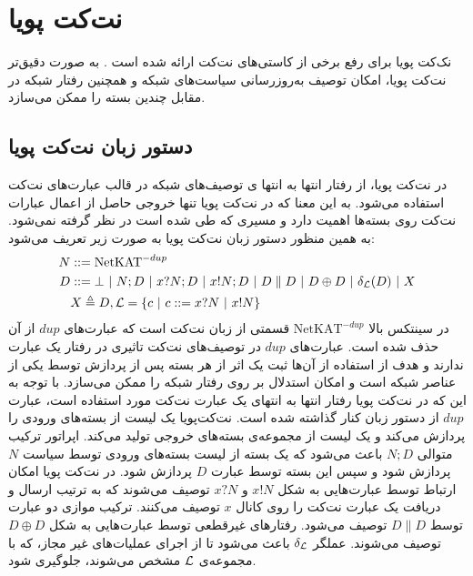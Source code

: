 \section{نت‌کت پویا}
نک‌کت‌ پویا%
برای رفع برخی از کاستی‌های نت‌کت ارائه شده است
\cite{dynetkat}.
به صورت دقیق‌تر نت‌کت پویا، امکان توصیف به‌روز‌رسانی سیاست‌های شبکه و همچنین رفتار شبکه در مقابل چندین بسته را ممکن می‌سازد.

\subsection{دستور زبان نت‌کت پویا}
در نت‌کت‌ پویا، از رفتار انتها به انتها‌%
ی توصیف‌های شبکه در قالب عبارت‌های نت‌کت استفاده می‌شود.
به این معنا که در نت‌کت پویا تنها خروجی حاصل از اعمال عبارات نت‌کت روی بسته‌ها اهمیت دارد و مسیری که طی شده است در نظر گرفته نمی‌شود.
به همین منظور دستور زبان نت‌کت‌ پویا به صورت زیر تعریف می‌شود:
\begin{align*}
    N & :: = \mathrm{NetKAT}^{-dup}                    \\
    D & :: = \bot ~|~ N;D ~|~ x?N;D ~|~ x!N;D ~|~ D\parallel D
    ~|~ D \oplus D ~|~ \delta_{\mathcal{L}}(D) ~|~ X                                     \\
      & X \triangleq D, \mathcal{L} = \{c ~|~ c ::= x?N ~|~ x!N\}
\end{align*}
در سینتکس بالا
$\mathrm{NetKAT}^{-dup}$
قسمتی از زبان نت‌کت است که عبارت‌های
$dup$
از آن حذف شده است.
عبارت‌های
$dup$
در توصیف‌های نت‌کت تاثیری در رفتار یک عبارت ندارند و هدف از استفاده از آن‌ها ثبت یک اثر از هر بسته پس از پردازش توسط یکی از عناصر شبکه است و امکان استدلال بر روی رفتار شبکه را ممکن می‌سازد.
با توجه به این که در نت‌کت پویا رفتار انتها به انتهای یک عبارت نت‌کت مورد استفاده است، عبارت
$dup$
از دستور زبان کنار گذاشته شده است.
نت‌کت‌پویا یک لیست از بسته‌های ورودی را پردازش می‌کند و یک لیست از مجموعه‌ی بسته‌های خروجی تولید می‌کند.
اپراتور ترکیب متوالی%
$N;D$
باعث می‌شود که یک بسته از لیست بسته‌های ورودی توسط سیاست
$N$
پردازش شود و سپس این بسته‌ توسط عبارت
$D$
پردازش شود.
در نت‌کت پویا امکان ارتباط توسط عبارت‌هایی به شکل
$x!N$
و
$x?N$
توصیف می‌شوند که به ترتیب ارسال و دریافت یک عبارت نت‌کت را روی کانال
$x$
توصیف می‌کنند.
ترکیب موازی%
دو عبارت توسط
$D \parallel D$
توصیف می‌شود.
رفتار‌های غیرقطعی%
توسط‌ عبارت‌هایی به شکل
$D \oplus D$
توصیف می‌شوند.
عملگر 
$\delta_{\mathcal{L}}$
باعث می‌شود تا از اجرای عملیات‌های غیر مجاز، که با مجموعه‌ی 
$\mathcal{L}$
مشخص می‌شوند، 
جلوگیری شود.

